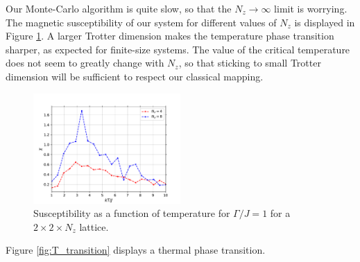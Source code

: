 \documentclass[11pt,openany]{article}
\begin{document}
Our Monte-Carlo algorithm is quite slow, so that the $N_z\to \infty$ limit is worrying. The magnetic susceptibility of our system for different values of $N_z$ is displayed in Figure \ref{fig:transition_chi_nz}. A larger Trotter dimension makes the temperature phase transition sharper, as expected for finite-size systems. The value of the critical temperature does not seem to greatly change with $N_z$, so that sticking to small Trotter dimension will be sufficient to respect our classical mapping.

\begin{figure}[H]
	\centering
	\includegraphics[width=0.5\textwidth]{Plots/T_transition_chi_nz.pdf}
	\caption{Susceptibility as a function of temperature for $\Gamma/J=1$ for a $2\times2\times N_z$ lattice.}
	\label{fig:transition_chi_nz}
\end{figure}

Figure \ref{fig:T_transition} displays a thermal phase transition.
 
\end{document}
